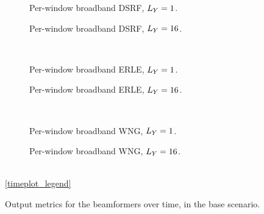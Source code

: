 
\begin{figure}[!ht]
	\centering
	\begin{subfigure}{0.48\textwidth}
		\centering
		
		\caption{Per-window broadband DSRF, $\Ly = 1$.}
		\label{subfig:lineplot__DSRF_l__iSER_n15__Ly_1}
	\end{subfigure}\hfill
	\begin{subfigure}{0.48\textwidth}
		\centering
		
		\caption{Per-window broadband DSRF, $\Ly = 16$.}
		\label{subfig:lineplot__DSRF_l__iSER_n15__Ly_16}
	\end{subfigure}\\[1em]
	\begin{subfigure}{0.48\textwidth}
		\centering
		
		\caption{Per-window broadband ERLE, $\Ly = 1$.}
		\label{subfig:lineplot__ERLE_l__iSER_n15__Ly_1}
	\end{subfigure}\hfill
	\begin{subfigure}{0.48\textwidth}
		\centering
		
		\caption{Per-window broadband ERLE, $\Ly = 16$.}
		\label{subfig:lineplot__ERLE_l__iSER_n15__Ly_16}
	\end{subfigure}\\[1em]
		\begin{subfigure}{0.48\textwidth}
		\centering
		
		\caption{Per-window broadband WNG, $\Ly = 1$.}
		\label{subfig:lineplot__WNG_l__iSER_n15__Ly_1}
	\end{subfigure}\hfill
	\begin{subfigure}{0.48\textwidth}
		\centering
		
		\caption{Per-window broadband WNG, $\Ly = 16$.}
		\label{subfig:lineplot__WNG_l__iSER_n15__Ly_16}
	\end{subfigure}\\[1.5em]
	\ref*{timeplot_legend}
	\caption{Output metrics for the beamformers over time, in the base scenario.}
	\label{fig:lineplot__iSER_n15__Ly_1}
\end{figure}

